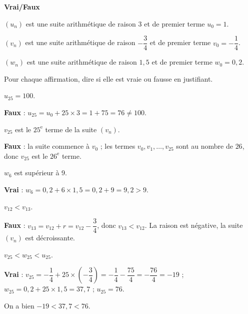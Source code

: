 \documentclass[12pt,a4paper]{book}
\begin{document}
\exerciceDS{}

\textbf{Vrai/Faux}
\begin{itemMet}
	\item $(u_n)$ est une suite arithmétique de raison 3 et de premier terme $u_0=1$.
	\item $(v_n)$ est une suite arithmétique de raison $-\dfrac{3}{4}$ et de premier terme $v_0=-\dfrac{1}{4}$.
	\item $(w_n)$ est une suite arithmétique de raison $1,5$ et de premier terme $w_0=0,2$.
\end{itemMet}

Pour chaque affirmation, dire si elle est vraie ou fausse en justifiant.
\begin{enumMet}
	\item $u_{25}=100$.

	\begin{corrBox}
		\textbf{Faux} : $u_{25}=u_0+25\times 3=1+75=76\neq 100$.
	\end{corrBox}
	\item $v_{25}$ est le $25^{\text{e}}$ terme de la suite $(v_n)$.

	\begin{corrBox}
		\textbf{Faux} : la suite commence à $v_0$ ; les termes $v_0, v_1, \dots, v_{25}$ sont au nombre de $26$, donc $v_{25}$ est le $26^{\text{e}}$ terme.
	\end{corrBox}
	\item $w_6$ est supérieur à 9.

	\begin{corrBox}
		\textbf{Vrai} : $w_6=0,2+6\times 1,5=0,2+9=9,2>9$.
	\end{corrBox}
	\item $v_{12}<v_{13}$.

	\begin{corrBox}
		\textbf{Faux} : $v_{13}=v_{12}+r=v_{12}-\dfrac{3}{4}$, donc $v_{13}<v_{12}$. La raison est négative, la suite $(v_n)$ est décroissante.
	\end{corrBox}
	\item $v_{25}<w_{25}<u_{25}$.

	\begin{corrBox}
		\textbf{Vrai} :
		$v_{25}=-\dfrac{1}{4}+25\times\left(-\dfrac{3}{4}\right)=-\dfrac{1}{4}-\dfrac{75}{4}=-\dfrac{76}{4}=-19$ ;
		$w_{25}=0,2+25\times 1,5=37,7$ ; $u_{25}=76$.

		On a bien $-19<37,7<76$.
	\end{corrBox}
\end{enumMet}
\end{document}
